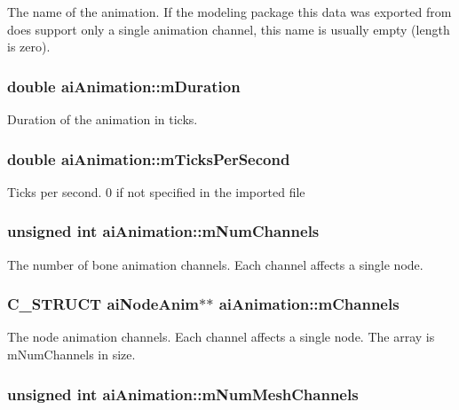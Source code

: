 The name of the animation. If the modeling package this data was exported from does support only a single animation channel, this name is usually empty (length is zero). \hypertarget{structai_animation_e2bbc49320b4b75c05e23e0ab704ece7}{
\subsubsection[mDuration]{\setlength{\rightskip}{0pt plus 5cm}double {\bf aiAnimation::mDuration}}}
\label{structai_animation_e2bbc49320b4b75c05e23e0ab704ece7}


Duration of the animation in ticks. \hypertarget{structai_animation_fd26a40c3f16b6aa6e150effa3eaeab1}{
\subsubsection[mTicksPerSecond]{\setlength{\rightskip}{0pt plus 5cm}double {\bf aiAnimation::mTicksPerSecond}}}
\label{structai_animation_fd26a40c3f16b6aa6e150effa3eaeab1}


Ticks per second. 0 if not specified in the imported file \hypertarget{structai_animation_ebfccf9a9aefa6084566d21e8a30b7e5}{
\subsubsection[mNumChannels]{\setlength{\rightskip}{0pt plus 5cm}unsigned int {\bf aiAnimation::mNumChannels}}}
\label{structai_animation_ebfccf9a9aefa6084566d21e8a30b7e5}


The number of bone animation channels. Each channel affects a single node. \hypertarget{structai_animation_89244bb68b725ffbb85137174c28e757}{
\subsubsection[mChannels]{\setlength{\rightskip}{0pt plus 5cm}C\_\-STRUCT {\bf aiNodeAnim}$\ast$$\ast$ {\bf aiAnimation::mChannels}}}
\label{structai_animation_89244bb68b725ffbb85137174c28e757}


The node animation channels. Each channel affects a single node. The array is mNumChannels in size. \hypertarget{structai_animation_c43aacd8502020174e553501f0b6bf5f}{
\subsubsection[mNumMeshChannels]{\setlength{\rightskip}{0pt plus 5cm}unsigned int {\bf aiAnimation::mNumMeshChannels}}}
\label{structai_animation_c43aacd8502020174e553501f0b6bf5f}


